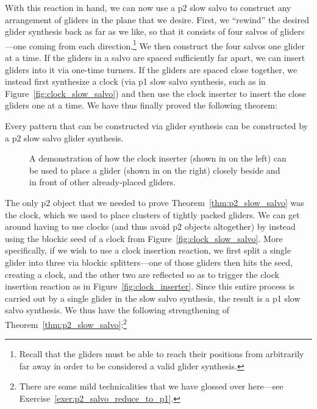With this reaction in hand, we can now use a p2 slow salvo to construct any arrangement of gliders in the plane that we desire. First, we ``rewind'' the desired glider synthesis back as far as we like, so that it consists of four salvos of gliders---one coming from each direction.\footnote{Recall that the gliders must be able to reach their positions from arbitrarily far away in order to be considered a valid glider synthesis.} We then construct the four salvos one glider at a time. If the gliders in a salvo are spaced sufficiently far apart, we can insert gliders into it via one-time turners. If the gliders are spaced close together, we instead first synthesize a clock (via p1 slow salvo synthesis, such as in Figure~\ref{fig:clock_slow_salvo}) and then use the clock inserter to insert the close gliders one at a time. We have thus finally proved the following theorem:

\begin{theorem}\label{thm:p2_slow_salvo}
	Every pattern that can be constructed via glider synthesis can be constructed by a p2 slow salvo glider synthesis.
\end{theorem}

\begin{figure}[!htb]
	\centering
	\caption{A demonstration of how the clock inserter (shown in  on the left) can be used to place a glider (shown in  on the right) closely beside and in front of other already-placed gliders.}\label{fig:clock_inserter_effective}
\end{figure}

The only p2 object that we needed to prove Theorem~\ref{thm:p2_slow_salvo} was the clock, which we used to place clusters of tightly packed gliders. We can get around having to use clocks (and thus avoid p$2$ objects altogether) by instead using the blockic seed of a clock from Figure~\ref{fig:clock_slow_salvo}. More specifically, if we wish to use a clock insertion reaction, we first split a single glider into three via blockic splitters---one of those gliders then hits the seed, creating a clock, and the other two are reflected so as to trigger the clock insertion reaction as in Figure~\ref{fig:clock_inserter}. Since this entire process is carried out by a single glider in the slow salvo synthesis, the result is a p1 slow salvo synthesis. We thus have the following strengthening of Theorem~\ref{thm:p2_slow_salvo}:\footnote{There are some mild technicalities that we have glossed over here---see Exercise~\ref{exer:p2_salvo_reduce_to_p1}.}%

